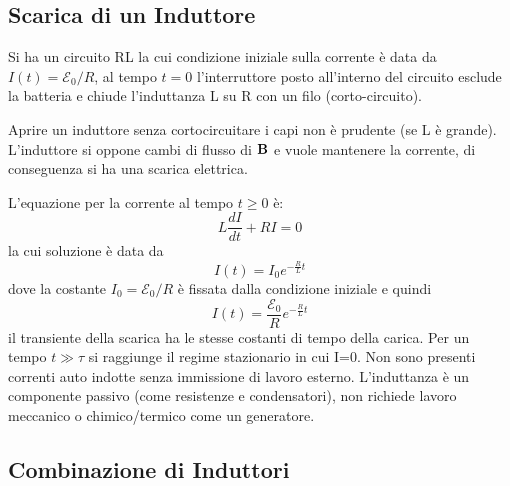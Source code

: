 \subsection{Scarica di un Induttore}


Si ha un circuito RL la cui condizione iniziale sulla corrente \`e data da $I(t) = \mathcal{E}_0/R$, al tempo $t = 0$ l'interruttore posto all'interno del circuito esclude la batteria e chiude l'induttanza L su R con un filo (corto-circuito).

\begin{remark}
Aprire un induttore senza cortocircuitare i capi non \`e prudente (se L \`e grande). L'induttore si oppone cambi di flusso di $\bold{B}$ e vuole mantenere la corrente, di conseguenza si ha una scarica elettrica. 	
\end{remark}

L'equazione per la corrente al tempo $t \geq 0$ \`e:
\begin{equation*}
	L \frac{dI}{dt} + RI = 0
\end{equation*}
la cui soluzione \`e data da
\begin{equation*}
	I(t) = I_0 e^{- \frac{R}{L}t}
\end{equation*}
dove la costante $I_0 = \mathcal{E}_0 / R$ \`e fissata dalla condizione iniziale e quindi
\begin{equation}
	I(t) = \frac{\mathcal{E}_0}{R}e^{- \frac{R}{L}t}
\end{equation} 
il transiente della scarica ha le stesse costanti di tempo della carica. Per un tempo $t \gg \tau $ si raggiunge il regime stazionario in cui I=0. Non sono presenti correnti auto indotte senza immissione di lavoro esterno. L'induttanza \`e un componente passivo (come resistenze e condensatori), non richiede lavoro meccanico o chimico/termico come un generatore.

\subsection{Combinazione di Induttori}

